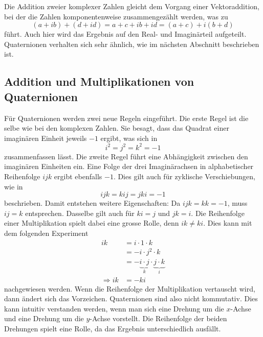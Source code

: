 Die Addition zweier komplexer Zahlen gleicht dem Vorgang einer 
Vektoraddition, bei der die Zahlen komponentenweise zusammengezählt
werden, was zu
\begin{equation*}
    (a + ib) + (d + id) = a+c + ib + id = (a+c) + i(b+d)
\end{equation*}
führt.
Auch hier wird das Ergebnis auf den Real- und Imaginärteil 
aufgeteilt. Quaternionen verhalten sich sehr ähnlich, wie im 
nächsten Abschnitt beschrieben ist.

\subsection{Addition und Multiplikationen von Quaternionen}
Für Quaternionen werden zwei neue Regeln eingeführt. Die erste 
Regel ist die selbe wie bei den komplexen Zahlen. Sie besagt, dass 
das Quadrat einer imaginären Einheit jeweils $-1$ ergibt, was sich in
\begin{equation*}
    i^2 = j^2 = k^2 = -1
\end{equation*}
zusammenfassen lässt.
Die zweite Regel führt eine Abhängigkeit zwischen den imaginären 
Einheiten ein. Eine Folge der drei Imaginärachsen in alphabetischer 
Reihenfolge $i\!jk$ ergibt ebenfalls $-1$. Dies gilt auch für 
zyklische Verschiebungen, wie in
\begin{equation*}
    i\!jk = ki\!j = jki = -1
\end{equation*}
beschrieben. Damit entstehen weitere Eigenschaften: Da $i\!jk = kk = 
-1$, muss $i\!j = k$ entsprechen. Dasselbe gilt auch für $ki = j$ und 
$jk = i$. Die Reihenfolge einer Multiplikation spielt dabei eine 
grosse Rolle, denn $ik \neq ki$. Dies kann mit dem folgenden
Experiment
\begin{align*}
    ik &= i \cdot 1 \cdot k \\
       &= -i \cdot j^2 \cdot k \\
       &= -\underbrace{i \cdot j}_k \cdot 
    \underbrace{j \cdot k}_{i} \\
        \Rightarrow ik &= -ki
\end{align*}
nachgewiesen werden.
Wenn die Reihenfolge der Multiplikation vertauscht wird, dann 
ändert sich das Vorzeichen. Quaternionen sind also nicht 
kommutativ. Dies kann intuitiv verstanden werden, wenn man sich 
%
eine Drehung um die $x$-Achse und eine Drehung um die $y$-Achse 
vorstellt. Die Reihenfolge der beiden Drehungen spielt eine Rolle, 
da das Ergebnis unterschiedlich ausfällt.

